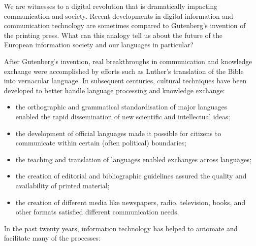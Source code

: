 \clearpage


\begin{multicols}{2}
We are witnesses to a digital revolution that is dramatically impacting communication and society. Recent developments in digital information and communication technology are sometimes compared to Gutenberg’s invention of the printing press. What can this analogy tell us about the future of the European information society and our languages in particular?


After Gutenberg’s invention, real breakthroughs in communication and knowledge exchange were accomplished by efforts such as Luther’s translation of the Bible into vernacular language. In subsequent centuries, cultural techniques have been developed to better handle language processing and knowledge exchange:

\begin{itemize}
\item the orthographic and grammatical standardisation of major languages enabled the rapid dissemination of new scientific and intellectual ideas;
\item the development of official languages made it possible for citizens to communicate within certain (often political) boundaries;
\item the teaching and translation of languages enabled exchanges across languages;
\item the creation of editorial and bibliographic guidelines assured the quality and availability of printed material;
\item the creation of different media like newspapers, radio, television, books, and other formats satisfied different communication needs. 
\end{itemize}

In the past twenty years, information technology has helped to automate and facilitate many of the processes:


\end{multicols}

